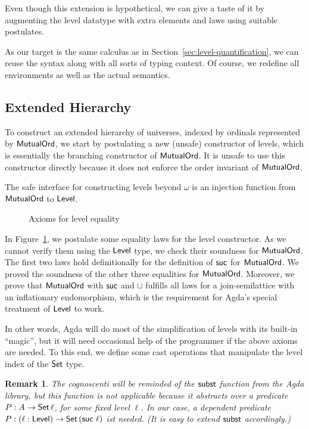 \documentclass[manuscript,screen,review,anonymous]{acmart}
\newtheorem{remark}{Remark}
\begin{document}
Even though this extension is hypothetical, we can give a taste of it
by augmenting the level datatype with extra elements and laws using
suitable postulates.

As our target is the same calculus as in
Section~\ref{sec:level-quantification}, we can reuse the syntax along
with all sorts of typing context. Of course, we redefine all
environments as well as the actual semantics.

\subsection{Extended Hierarchy}
\label{sec:extended-hierarchy}

To construct an extended hierarchy of universes, indexed by ordinals
represented by $\AMutualOrd$, 
we start by postulating a new (unsafe) constructor of levels, which is
essentially the branching constructor of $\AMutualOrd$. It is unsafe
to use this constructor directly because it does not enforce the order invariant of $\AMutualOrd$.

\LCantor

The safe interface for constructing levels beyond $\omega$ is an
injection function from $\AMutualOrd$ to $\ALevel$.

\LtoLevel

\begin{figure}[tp]
  \LAxioms
  \caption{Axioms for level equality}
  \label{fig:axioms-level-equality}
\end{figure}
In Figure~\ref{fig:axioms-level-equality}, we postulate some equality
laws for the level constructor. As we cannot verify them using the
$\ALevel$ type, we check their soundness for $\AMutualOrd$.
The first two laws hold definitionally for the definition of $\Asuc$
for $\AMutualOrd$. We proved the soundness of the other three
equalities for $\AMutualOrd$.
Moreover, we prove that $\AMutualOrd$ with $\Asuc$ and $\sqcup$ fulfills all laws
for a join-semilattice with an inflationary endomorphism, which is the
requirement for Agda's special treatment of $\ALevel$ to work.

In other words, Agda will do most of the simplification of levels with
its built-in ``magic'', but it will need occasional help of the
programmer if the above axioms are needed. To this end, we define some
cast operations that manipulate the level index of the $\ASet$ type.

\Lcast

\begin{remark}
  The cognoscenti will be reminded of the $\Asubst$ function from the
  Agda library, but this function is not applicable because it
  abstracts over a predicate $P : A \to \ASeti\ell$, for some fixed
  level $\ell$. In our case, a \emph{dependent} predicate
  $P : (\ell : \ALevel) \to \ASeti{(\Asuc~\ell)}$ ist needed. (It is
  easy to extend $\Asubst$ accordingly.)
\end{remark}
\end{document}
